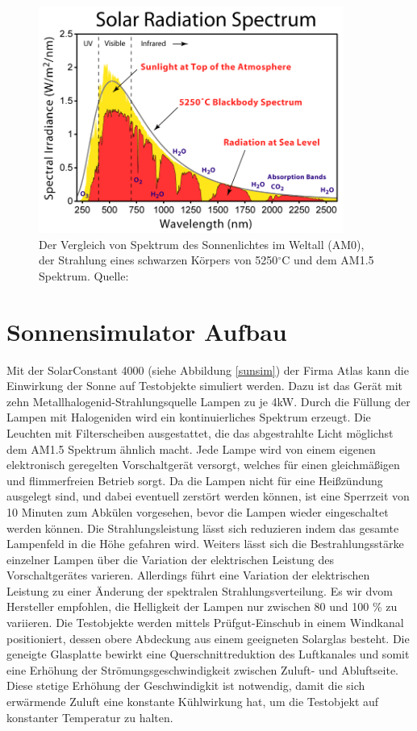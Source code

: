 \documentclass[a4paper,bibtotoc,oneside]{scrbook}
\begin{document}
\begin{figure}[htbp]
\centering
\includegraphics[width=100mm]{img/Solar_Spectrum.png}
\caption[Sonnenspektrum]{Der Vergleich von Spektrum des Sonnenlichtes im Weltall (AM0), der Strahlung eines schwarzen Körpers von 5250$^{\circ}$C und dem AM1.5 Spektrum. Quelle: \cite{sun}}\label{sunspec}
\end{figure}


\section{Sonnensimulator Aufbau}\thispagestyle{empty}


Mit der SolarConstant 4000 (siehe Abbildung \ref{sunsim}) der Firma Atlas kann die Einwirkung der Sonne auf Testobjekte simuliert werden. Dazu ist das Gerät mit zehn Metallhalogenid-Strahlungsquelle Lampen zu je 4kW. Durch die Füllung der Lampen mit Halogeniden wird ein kontinuierliches Spektrum erzeugt. Die Leuchten mit Filterscheiben ausgestattet, die das abgestrahlte Licht möglichst dem AM1.5 Spektrum ähnlich macht.
Jede Lampe wird von einem eigenen elektronisch geregelten Vorschaltgerät versorgt, welches für einen gleichmäßigen und flimmerfreien Betrieb sorgt.
Da die Lampen nicht für eine Heißzündung ausgelegt sind, und dabei eventuell zerstört werden können, ist eine Sperrzeit von 10 Minuten zum Abkülen vorgesehen, bevor die Lampen wieder eingeschaltet werden können.
Die Strahlungsleistung lässt sich reduzieren indem das gesamte Lampenfeld in die Höhe gefahren wird.
Weiters lässt sich die Bestrahlungsstärke einzelner Lampen über die Variation der elektrischen Leistung des Vorschaltgerätes varieren.
Allerdings führt eine Variation der elektrischen Leistung zu einer Änderung der spektralen Strahlungsverteilung. Es wir dvom Hersteller empfohlen, die Helligkeit der Lampen nur zwischen 80 und 100 \% zu variieren.
Die Testobjekte werden mittels Prüfgut-Einschub in einem Windkanal positioniert, dessen obere Abdeckung aus einem geeigneten Solarglas besteht. Die geneigte Glasplatte bewirkt eine Querschnittreduktion des Luftkanales und somit eine Erhöhung der Strömungsgeschwindigkeit zwischen Zuluft- und Abluftseite. Diese stetige Erhöhung der Geschwindigkit ist notwendig, damit die sich erwärmende Zuluft eine konstante Kühlwirkung hat, um die Testobjekt auf konstanter Temperatur zu halten.
\end{document}
